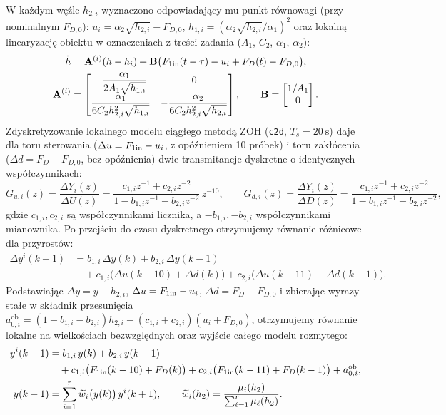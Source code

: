 W każdym węźle $h_{2,i}$ wyznaczono odpowiadający mu punkt równowagi (przy nominalnym $F_{D,0}$): $u_i=\alpha_2\sqrt{h_{2,i}}-F_{D,0}$, $h_{1,i}=(\alpha_2\sqrt{h_{2,i}}/\alpha_1)^2$ oraz lokalną linearyzację obiektu w oznaczeniach z treści zadania ($A_1$, $C_2$, $\alpha_1$, $\alpha_2$):
\begin{align}
\dot h &= \mathbf{A}^{(i)}(h-h_i)+\mathbf{B}\bigl(F_{1\mathrm{in}}(t-\tau)-u_i+F_D(t)-F_{D,0}\bigr),\\
\mathbf{A}^{(i)}&=\begin{bmatrix}
-\dfrac{\alpha_1}{2A_1\sqrt{h_{1,i}}} & 0\\[8pt]
\dfrac{\alpha_1}{6C_2h_{2,i}^2\sqrt{h_{1,i}}} & -\dfrac{\alpha_2}{6C_2h_{2,i}^2\sqrt{h_{2,i}}}
\end{bmatrix},\qquad
\mathbf{B}=\begin{bmatrix}1/A_1\\0\end{bmatrix}.
\end{align}
Zdyskretyzowanie lokalnego modelu ciągłego metodą ZOH (\texttt{c2d}, $T_s=20\ \mathrm{s}$) daje dla toru sterowania ($\Delta u=F_{1\mathrm{in}}-u_i$, z opóźnieniem 10 próbek) i toru zakłócenia ($\Delta d=F_D-F_{D,0}$, bez opóźnienia) dwie transmitancje dyskretne o identycznych współczynnikach:
\begin{equation}
 G_{u,i}(z)=\frac{\Delta Y_i(z)}{\Delta U(z)}=\frac{c_{1,i}z^{-1}+c_{2,i}z^{-2}}{1-b_{1,i}z^{-1}-b_{2,i}z^{-2}}\,z^{-10},\qquad
 G_{d,i}(z)=\frac{\Delta Y_i(z)}{\Delta D(z)}=\frac{c_{1,i}z^{-1}+c_{2,i}z^{-2}}{1-b_{1,i}z^{-1}-b_{2,i}z^{-2}},
\end{equation}
gdzie $c_{1,i},c_{2,i}$ są współczynnikami licznika, a $-b_{1,i},-b_{2,i}$ współczynnikami mianownika. Po przejściu do czasu dyskretnego otrzymujemy równanie różnicowe dla przyrostów:
\begin{align}
 \Delta y^i(k+1)&=b_{1,i}\,\Delta y(k)+b_{2,i}\,\Delta y(k-1)\nonumber\\
 &\quad+c_{1,i}\bigl(\Delta u(k-10)+\Delta d(k)\bigr)+c_{2,i}\bigl(\Delta u(k-11)+\Delta d(k-1)\bigr).
\end{align}
Podstawiając $\Delta y=y-h_{2,i}$, $\Delta u=F_{1\mathrm{in}}-u_i$, $\Delta d=F_D-F_{D,0}$ i zbierając wyrazy stałe w składnik przesunięcia $a_{0,i}^{\mathrm{ob}}=(1-b_{1,i}-b_{2,i})h_{2,i}-(c_{1,i}+c_{2,i})(u_i+F_{D,0})$, otrzymujemy równanie lokalne na wielkościach bezwzględnych oraz wyjście całego modelu rozmytego:
\begin{align}
 y^i(k+1)&=b_{1,i}\,y(k)+b_{2,i}\,y(k-1)\nonumber\\
 &\quad+c_{1,i}\bigl(F_{1\mathrm{in}}(k-10)+F_D(k)\bigr)+c_{2,i}\bigl(F_{1\mathrm{in}}(k-11)+F_D(k-1)\bigr)+a_{0,i}^{\mathrm{ob}},\\
 y(k+1)&=\sum_{i=1}^r\widetilde w_i\bigl(y(k)\bigr)\,y^i(k+1),\qquad
 \widetilde w_i(h_2)=\frac{\mu_i(h_2)}{\sum_{\ell=1}^r\mu_\ell(h_2)}.
\end{align}

